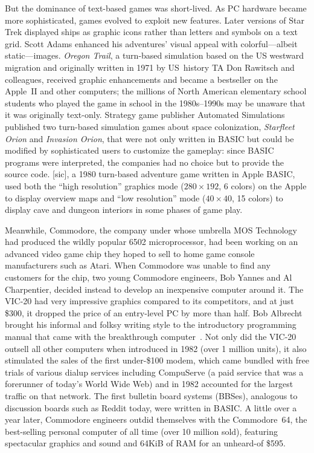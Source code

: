 But the dominance of text-based games was short-lived.  As PC hardware
became more sophisticated, games evolved to exploit new features.
Later versions of Star Trek displayed ships as graphic icons rather than
letters and symbols on a text grid.
Scott Adams enhanced his adventures' visual appeal with colorful---albeit
static---images.
\emph{Oregon Trail}, a turn-based simulation based on the US westward
migration and originally written in 1971 by US~history TA Don Rawitsch and colleagues,
received graphic enhancements and became
a bestseller on the Apple~II and other computers;
the millions of
North American elementary school students who played the game in school
in the 1980s--1990s
may be unaware that it was originally text-only.
Strategy game publisher
Automated Simulations published two turn-based simulation games about
space colonization,
\emph{Starfleet Orion} and \emph{Invasion Orion}, that were not only
written in BASIC but could be modified by sophisticated users to
customize the gameplay: since BASIC programs were interpreted, the
companies had no choice but to provide the source code.
 [sic], a 1980 turn-based adventure game
written in Apple BASIC,
used both the  ``high resolution'' graphics mode ($280\times 192$, 6 colors)
on the Apple to display overview maps and
``low resolution'' mode ($40\times 40$, 15
colors) to display cave and dungeon interiors in some phases of game play.


Meanwhile, Commodore, the company under whose umbrella MOS Technology
had produced the wildly popular 6502 microprocessor, had been working on
an advanced video game chip they hoped to sell to home game console manufacturers
such as Atari.
When Commodore was unable to find any customers for the chip, two young
Commodore engineers, Bob Yannes and Al Charpentier, decided instead to
develop an inexpensive computer around it.
The VIC-20 had very impressive graphics
compared to its competitors, and at just \$300, it dropped the price
of an entry-level PC by more than half.
Bob Albrecht brought his informal and folksy writing style to the
introductory programming manual that came with the breakthrough
computer~\cite{commodore}.
Not only did the VIC-20 outsell all other computers when introduced in
1982 (over 1 million units), it also stimulated the sales of the first
under-\$100 modem, which came bundled with free trials of various dialup
services including CompuServe (a paid service that was a forerunner of
today's World Wide Web) and in 1982 accounted for the largest
traffic on that network.
The first bulletin board systems (BBSes), analogous to discussion
boards such as Reddit today, were written in BASIC.
A little over a year later, Commodore engineers outdid themselves with
the Commodore~64, the best-selling personal computer of all time (over
10 million sold), featuring spectacular graphics and sound and 64KiB
of RAM for an unheard-of \$595.

